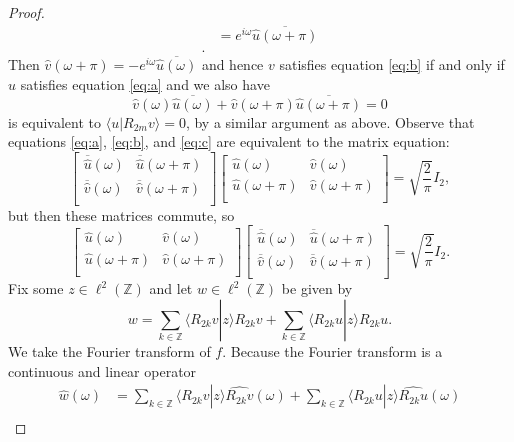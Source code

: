 \documentclass{report}
\newcommand{\Z}{\mathbb{Z}}
\begin{document}
\begin{proof}
\begin{align*}
  &= e^{i\omega}\overline{\hat u (\omega+\pi)}\\.
 \end{align*}
Then $\hat v (\omega+\pi)=-e^{i\omega}\overline{\hat u (\omega)}$ and hence $v$ satisfies equation \eqref{eq:b} if and only if $u$ satisfies equation \eqref{eq:a} and we also have
\begin{equation}
 \label{eq:c}
 \hat v (\omega)\overline{\hat u (\omega)}+\hat v (\omega+\pi) \overline{ \hat u(\omega + \pi)}=0
 \end{equation}
  is equivalent to $\langle u | R_{2m} v\rangle=0$, by a similar argument as above. Observe that equations \ref{eq:a}, \ref{eq:b}, and \ref{eq:c} are equivalent to the matrix equation:
$$
 \left[ \begin{array}{cc} \overline{ \hat u}(\omega) & \overline{ \hat u}(\omega+\pi)\\ \overline{ \hat v}(\omega) & \overline{ \hat v}(\omega+\pi)\\\end{array} \right ]  \left[ \begin{array}{cc} \hat u(\omega) & \hat v(\omega)\\ \hat u(\omega+\pi) & \hat v(\omega+\pi)\\\end{array} \right ]=\sqrt{\frac{2}{\pi}}I_2,
$$
but then these matrices commute, so
\begin{equation}
\label{eq:mat}
 \left[ \begin{array}{cc} \hat u(\omega) & \hat v(\omega)\\ \hat u(\omega+\pi) & \hat v(\omega+\pi)\\\end{array} \right ] \left[ \begin{array}{cc} \overline{ \hat u}(\omega) & \overline{ \hat u}(\omega+\pi)\\ \overline{ \hat v}(\omega) & \overline{ \hat v}(\omega+\pi)\\\end{array} \right ]=\sqrt{\frac{2}{\pi}}I_2.
\end{equation}
Fix some $z \in \ell^2 (\Z)$ and let $w \in \ell^2 (\Z)$ be given by
$$w=\sum_{k\in \Z}\langle R_{2k}v|z\rangle R_{2k}v+\sum_{k\in \Z}\langle R_{2k}u|z\rangle R_{2k}u.$$
We take the Fourier transform of $f$. Because the Fourier transform is a continuous and linear operator 
\begin{align*}
\hat w (\omega) &=\sum_{k\in \Z}\langle R_{2k}v|z\rangle \widehat{R_{2k}v}(\omega)+\sum_{k\in \Z}\langle R_{2k}u|z\rangle \widehat{R_{2k}u}(\omega)\\

\end{align*}
\end{proof}
\end{document}
